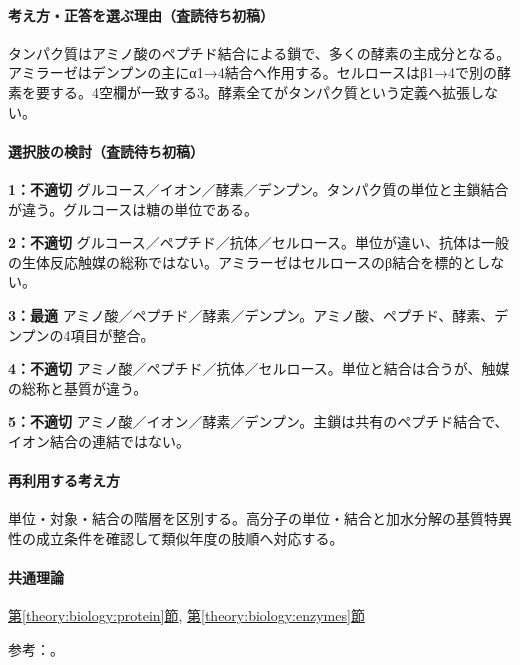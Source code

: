 \paragraph{考え方・正答を選ぶ理由（査読待ち初稿）} タンパク質はアミノ酸のペプチド結合による鎖で、多くの酵素の主成分となる。アミラーゼはデンプンの主にα1→4結合へ作用する。セルロースはβ1→4で別の酵素を要する。4空欄が一致する3。酵素全てがタンパク質という定義へ拡張しない。

\paragraph{選択肢の検討（査読待ち初稿）}\mbox{}\par

\noindent\textbf{1：不適切} グルコース／イオン／酵素／デンプン。タンパク質の単位と主鎖結合が違う。グルコースは糖の単位である。\par

\noindent\textbf{2：不適切} グルコース／ペプチド／抗体／セルロース。単位が違い、抗体は一般の生体反応触媒の総称ではない。アミラーゼはセルロースのβ結合を標的としない。\par

\noindent\textbf{3：最適} アミノ酸／ペプチド／酵素／デンプン。アミノ酸、ペプチド、酵素、デンプンの4項目が整合。\par

\noindent\textbf{4：不適切} アミノ酸／ペプチド／抗体／セルロース。単位と結合は合うが、触媒の総称と基質が違う。\par

\noindent\textbf{5：不適切} アミノ酸／イオン／酵素／デンプン。主鎖は共有のペプチド結合で、イオン結合の連結ではない。\par

\paragraph{再利用する考え方} 単位・対象・結合の階層を区別する。高分子の単位・結合と加水分解の基質特異性の成立条件を確認して類似年度の肢順へ対応する。

\paragraph{共通理論} \hyperref[theory:biology:protein]{第\ref*{theory:biology:protein}節}, \hyperref[theory:biology:enzymes]{第\ref*{theory:biology:enzymes}節}

\par 参考：\cite{mit_amino,iubmb_amylase}。

